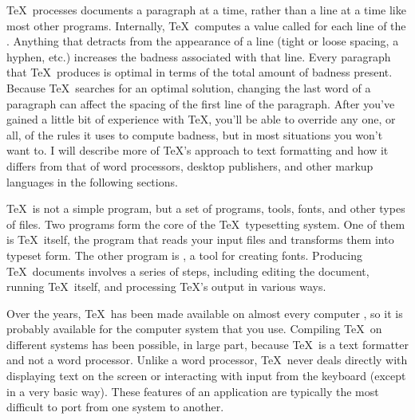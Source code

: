 \TeX\ processes documents a paragraph at a time, rather than a line
at a time like most other programs.  Internally, \TeX\ computes a value 
called {\it{}} for each
line of the .  Anything that
detracts from the appearance of a line (tight or loose spacing, a
hyphen, etc.) increases the badness associated with that line.  Every
paragraph that \TeX\ produces is optimal in terms of the total amount
of badness present.  Because \TeX\ searches for an optimal
solution, changing the last word of a paragraph can affect
the spacing of the first line of the paragraph.
After you've gained a little bit of experience with \TeX, you'll be
able to override any one, or all, of the rules it uses to compute
badness, but in most situations you won't want to.  I will describe more
of \TeX's approach to text formatting and how it differs from that
of word processors, desktop publishers, and other markup languages in
the following sections.

\TeX\ is not a simple program, but a set of
programs, tools, fonts, and other types of files. 
Two programs form the core of the \TeX\ typesetting
system.  One of them is \TeX\ itself, the program that reads
your input files and transforms them into typeset form.  The other
program is \MF, a tool for creating fonts. 
Producing \TeX\ documents involves a series of steps, including
editing the document, running \TeX\ itself, and processing \TeX's
output in various ways.

%

Over the years, \TeX\ has been made available on almost every computer
, so it is probably available for the
computer system that you use.  Compiling \TeX\ on different systems
has been possible, in large part, because \TeX\ is a text formatter and
not a word processor. 
Unlike a word processor, \TeX\ never deals directly with displaying
text on the screen or interacting with input from the keyboard (except in a
very basic way).  These features of an application are
typically the most difficult to port from one system to another.

